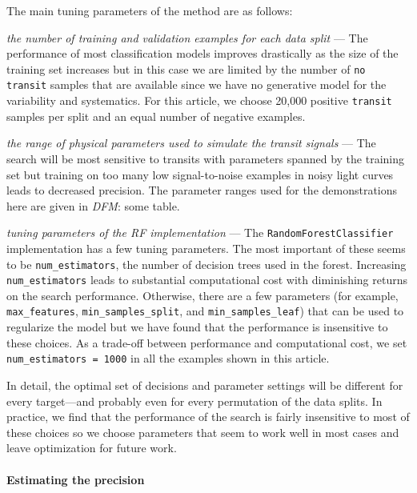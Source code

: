 \documentclass[12pt,preprint]{aastex}
\newcommand{\paper}{article}
\newcommand{\todo}[3]{{\color{#2}\emph{#1}: #3}}
\newcommand{\dfmtodo}[1]{\todo{DFM}{red}{#1}}
\begin{document}
The main tuning parameters of the method are as follows:
\begin{itemize}

{\item \emph{the number of training and validation examples for each data
split} --- The performance of most classification models improves drastically
as the size of the training set increases but in this case we are limited by
the number of \texttt{no transit} samples that are available since we have no
generative model for the variability and systematics.
For this \paper, we choose 20,000 positive \texttt{transit} samples per split
and an equal number of negative examples.}

{\item \emph{the range of physical parameters used to simulate the transit
signals} --- The search will be most sensitive to transits with parameters
spanned by the training set but training on too many low signal-to-noise
examples in noisy light curves leads to decreased precision.
The parameter ranges used for the demonstrations here are given in
\dfmtodo{some table}.}

{\item \emph{tuning parameters of the RF implementation} --- The
\texttt{RandomForestClassifier} implementation has a few tuning parameters.
The most important of these seems to be \texttt{num\_estimators}, the number
of decision trees used in the forest.
Increasing \texttt{num\_estimators} leads to substantial computational cost
with diminishing returns on the search performance.
Otherwise, there are a few parameters (for example, \texttt{max\_features},
\texttt{min\_samples\_split}, and \texttt{min\_samples\_leaf}) that can be
used to regularize the model but we have found that the performance is
insensitive to these choices.
As a trade-off between performance and computational cost, we set
\texttt{num\_estimators = 1000} in all the examples shown in this \paper.}

\end{itemize}
In detail, the optimal set of decisions and parameter settings will be
different for every target---and probably even for every permutation of the
data splits.
In practice, we find that the performance of the search is fairly insensitive
to most of these choices so we choose parameters that seem to work well in
most cases and leave optimization for future work.


\paragraph{Estimating the precision}
\end{document}
